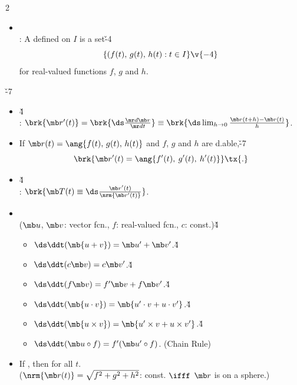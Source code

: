 \documentclass[dvipdfmx,a4paper,titlepage,9pt]{jsarticle}
\begin{document}
\begin{multicols*}{2}
\begin{itemize}[label={-}]
\item{} \\
: A  defined on $I$ is a set\v{-4}
$$\{(f(t),\,g(t),\,h(t):t\in I\}\v{-4}$$
\;\;for real-valued functions $f$, $g$ and $h$.\\
\end{itemize}

\v{-7}
\begin{itemize}[label={-}]
\item{}\v4\\
: $\brk{\mb r'(t)}=\brk{\ds\frac{\mr d\mb r}{\mr dt}}\equiv\brk{\ds\lim_{h\to0}\frac{\mb r(t+h)-\mb r(t)}h}$.\\

\item If $\mb r(t)=\ang{f(t),\,g(t),\,h(t)}$ and $f$, $g$ and $h$ are d.able,\v{-7}\\
$$\brk{\mb r'(t)=\ang{f'(t),\:g'(t),\:h'(t)}}\tx{.}$$

\item{}\v4\\
: $\brk{\mb T(t)\equiv\ds\frac{\mb r'(t)}{\nrm{\mb r'(t)}}}$. \\

\item{}\\
($\mb u$, $\mb v$: vector fcn., $f$: real-valued fcn., $c$: const.)\v4
\begin{itemize}[label=\Cdot]
\setlength{\leftskip}{-5pt}
\item $\ds\ddt(\mb{u+v})=\mb u'+\mb v'$.\v4
\item $\ds\ddt(c\mb v)=c\mb v'$.\v4
\item $\ds\ddt(f\mb v)=f'\mb v+f\mb v'$.\v4
\item $\ds\ddt(\mb{u\cdot v})=\mb{u'\cdot v+u\cdot v'}$.\v4
\item $\ds\ddt(\mb{u\times v})=\mb{u'\times v+u\times v'}$.\v4
\item $\ds\ddt(\mb u\circ f)=f'(\mb u'\circ f)$. \hfill{\Gray (Chain Rule)}\\
\end{itemize}

\item If , then  for all $t$. \\
{\Gray ($\nrm{\mb r(t)}=\sqrt{f^2+g^2+h^2}$: const. $\ifff$ $\mb r$ is on a sphere.)} \\


\end{itemize}
\end{multicols*}
\end{document}

